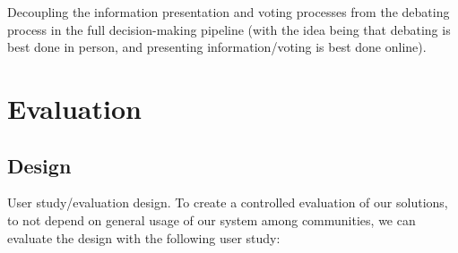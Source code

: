 \documentclass{sigchi}
\begin{document}
Decoupling the information presentation and voting processes from the debating process in the full decision-making
pipeline (with the idea being that debating is best done in person, and presenting information/voting is best done online).

\section{Evaluation}

\subsection{Design}

User study/evaluation design.
To create a controlled evaluation of our solutions, to not depend on general usage of our system among communities,
we can evaluate the design with the following user study:
\end{document}
